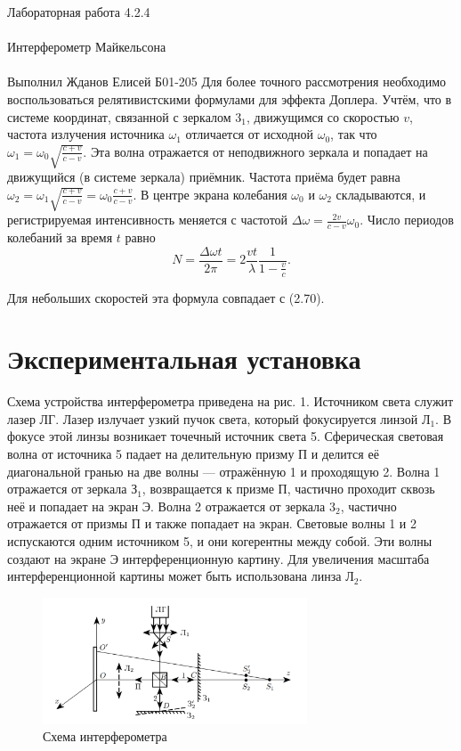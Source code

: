 \documentclass{astroedu-lab}
\begin{document}
\begin{problem}{\huge Лабораторная работа 4.2.4\\\\Интерферометр Майкельсона\\\\Выполнил Жданов Елисей Б01-205}
Для более точного рассмотрения необходимо воспользоваться релятивистскими формулами для эффекта Доплера. Учтём, что в системе координат, связанной с зеркалом $3_1$, движущимся со скоростью $v$, частота излучения источника $\omega_1$ отличается от исходной $\omega_0$, так что $\omega_1=\omega_0 \sqrt{\frac{c+v}{c-v}}$. Эта волна отражается от неподвижного зеркала и попадает на движущийся (в системе зеркала) приёмник. Частота приёма будет равна $\omega_2=\omega_1 \sqrt{\frac{c+v}{c-v}}=\omega_0 \frac{c+v}{c-v}$. В центре экрана колебания $\omega_0$ и $\omega_2$ складываются, и регистрируемая интенсивность меняется с частотой $\Delta \omega=\frac{2 v}{c-v} \omega_0$. Число периодов колебаний за время $t$ равно
$$
N=\frac{\Delta \omega t}{2 \pi}=2 \frac{v t}{\lambda} \frac{1}{1-\frac{v}{c}} .
$$

Для небольших скоростей эта формула совпадает с (2.70).


\section{Экспериментальная установка}


Схема устройства интерферометра приведена на рис. 1. Источником света служит лазер ЛГ. Лазер излучает узкий пучок света, который фокусируется линзой Л$_1$. В фокусе этой линзы возникает точечный источник света 5. Сферическая световая волна от источника 5 падает на делительную призму П и делится её диагональной гранью на две волны --- отражённую 1 и проходящую 2. Волна 1 отражается от зеркала З$_1$, возвращается к призме П, частично проходит сквозь неё и попадает на экран Э. Волна 2 отражается от зеркала 3$_2$, частично отражается от призмы П и также попадает на экран. Световые волны 1 и 2 испускаются одним источником 5, и они когерентны между собой. Эти волны создают на экране Э интерференционную картину. Для увеличения масштаба интерференционной картины может быть использована линза Л$_2$.
	
		\begin{figure}[h]
		\begin{center}
			\includegraphics[width = 0.7\textwidth]{424-1.png}
			\caption{Схема интерферометра}
		\end{center}
	\end{figure}
	

\end{problem}
\end{document}
